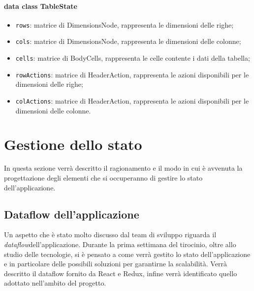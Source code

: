 \paragraph*{data class TableState}
\begin{itemize}
	\item \verb|rows|: matrice di DimensionsNode, rappresenta le dimensioni delle righe;
	\item \verb|cols|: matrice di DimensionsNode, rappresenta le dimensioni delle colonne;
	\item \verb|cells|: matrice di BodyCells, rappresenta le celle contente i dati della tabella;
	\item \verb|rowActions|: matrice di HeaderAction, rappresenta le azioni disponibili per le dimensioni delle righe;
	\item \verb|colActions|:  matrice di HeaderAction, rappresenta le azioni disponibili per le dimensioni delle colonne.
\end{itemize}

\section{Gestione dello stato}
In questa sezione verrà descritto il ragionamento e il modo in cui è avvenuta la progettazione degli elementi che si occuperanno di gestire lo stato dell'applicazione.

\subsection{Dataflow dell'applicazione}
Un aspetto che è stato molto discusso dal team di sviluppo riguarda il \emph{dataflow}\glosp dell'applicazione. Durante la prima settimana del tirocinio, oltre allo studio delle tecnologie, si è pensato a come verrà gestito lo stato dell'applicazione e in particolare delle possibili soluzioni per garantirne la scalabilità. Verrà descritto il dataflow fornito da React e Redux, infine verrà identificato quello adottato nell'ambito del progetto.

